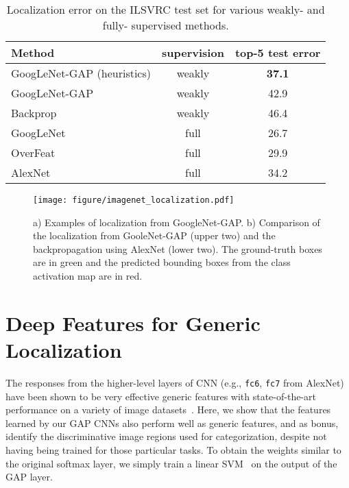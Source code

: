 \documentclass[10pt,twocolumn,letterpaper]{article}
\begin{document}
\begin{table}\caption{Localization error on the ILSVRC test set for various weakly- and fully- supervised methods.}\label{networktestset}
\centering
\footnotesize
\begin{tabular}{ l | c | c  }
  \hline  
  \hline                       
  Method & supervision &  top-5 test error \\
    \hline  
  GoogLeNet-GAP (heuristics)  & weakly & \textbf{37.1} \\     
  GoogLeNet-GAP  & weakly & 42.9 \\ 
  Backprop \cite{simonyan2013deep} & weakly & 46.4 \\
      \hline 
  GoogLeNet \cite{szegedy2014going} & full & 26.7 \\
  OverFeat \cite{sermanet2013overfeat} & full & 29.9 \\        
  AlexNet \cite{szegedy2014going} & full & 34.2 \\
  \hline  
\end{tabular}
\end{table}

\begin{figure*}
\begin{center}
\texttt{[image: figure/imagenet\_localization.pdf]}
\end{center}
\caption{a) Examples of localization from GoogleNet-GAP. b) Comparison of the localization from GooleNet-GAP (upper two) and the backpropagation using AlexNet (lower two). The ground-truth boxes are in green and the predicted bounding boxes from the class activation map are in red.}
\label{fig:localizationexample}
\end{figure*}






\section{Deep Features for Generic Localization}

The responses from the higher-level layers of CNN (e.g., \texttt{fc6}, \texttt{fc7} from AlexNet) have been shown to be very effective generic features with state-of-the-art performance on a variety of image datasets~\cite{donahue2014decaf,razavian2014cnn,zhou2014learning}. Here, we show that the features learned by our GAP CNNs also perform well as generic features, and as bonus, identify the discriminative image regions used for categorization, despite not having being trained for those particular tasks. To obtain the weights similar to the original softmax layer, we simply train a linear SVM~\cite{fan2008liblinear} on the output of the GAP layer.
\end{document}
